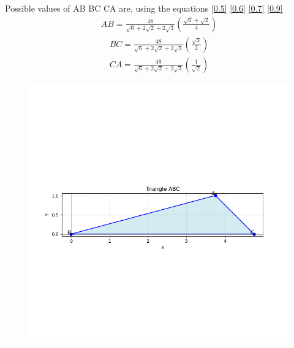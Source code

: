 \documentclass[journal]{IEEEtran}
\begin{document}
Possible values of AB BC CA are, using the equations \ref{0.5} \ref{0.6} \ref{0.7} \ref{0.9}
\begin{align}
    AB = \frac{48}{\sqrt{6}+2\sqrt{2}+2\sqrt{3}}(\frac{\sqrt{6}+\sqrt{2}}{4})
\end{align}
\begin{align}
    BC = \frac{48}{\sqrt{6}+2\sqrt{2}+2\sqrt{3}}(\frac{\sqrt{3}}{2})
\end{align}
\begin{align}
    CA = \frac{48}{\sqrt{6}+2\sqrt{2}+2\sqrt{3}}(\frac{1}{\sqrt{2}})
\end{align}
\begin{figure}[h!]
   \centering
   \includegraphics[width=\linewidth]{figs/Figure_1.png}
   \caption{}
   \label{stemplot}
\end{figure}
\end{document}
